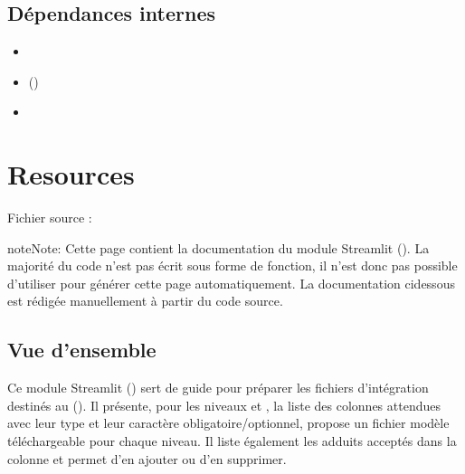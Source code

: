 \documentclass[letterpaper,10pt,english]{sphinxmanual}
\begin{document}
\section{Dépendances internes}
\label{\detokenize{3_Export:dependances-internes}}\begin{itemize}
\item {} 
\sphinxAtStartPar
{}

\item {} 
\sphinxAtStartPar
{\hyperref[\detokenize{api:module-config}]{}} ()

\item {} 
\sphinxAtStartPar
{\hyperref[\detokenize{api:utils.msp_export.generate_msp}]{}}

\end{itemize}

\sphinxstepscope


\chapter{Resources}
\label{\detokenize{4_Resources:resources}}\label{\detokenize{4_Resources::doc}}
\sphinxAtStartPar
Fichier source : 

\begin{sphinxadmonition}{note}{Note:}
\sphinxAtStartPar
Cette page contient la documentation du module Streamlit ().
La majorité du code n’est pas écrit sous forme de fonction, il n’est donc pas possible d’utiliser 
pour générer cette page automatiquement. La documentation ci\sphinxhyphen{}dessous est rédigée manuellement
à partir du code source.
\end{sphinxadmonition}


\section{Vue d’ensemble}
\label{\detokenize{4_Resources:vue-d-ensemble}}
\sphinxAtStartPar
Ce module Streamlit () sert de guide pour préparer les fichiers
d’intégration destinés au {\hyperref[\detokenize{1_Integration::doc}]{}} (). Il présente,
pour les niveaux  et , la liste des colonnes attendues avec
leur type et leur caractère obligatoire/optionnel, propose un fichier modèle
téléchargeable pour chaque niveau. Il liste également les adduits acceptés dans la
colonne  et permet d’en ajouter ou d’en supprimer.
\end{document}
